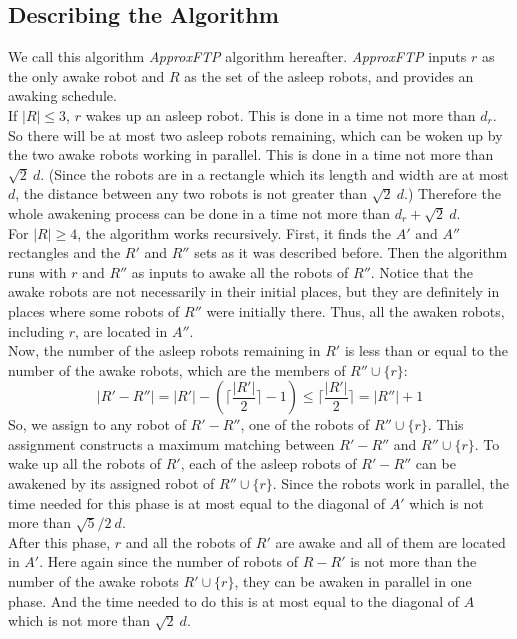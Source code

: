 \documentclass{cccg12}
\begin{document}
\subsection{Describing the Algorithm}
We call this algorithm \textit{ApproxFTP} algorithm hereafter. \textit{ApproxFTP}  inputs $r$ as the only awake robot and $R$ as the set of the asleep robots, and provides an awaking schedule.\\
If ${|R| \leq 3 }$, $r$ wakes up an asleep robot. This is done in a time not more than $d_r$.  So there will be at most two asleep robots remaining, which can be woken up by the two awake robots working in parallel. This is done in a time not more than ${ \sqrt{2}~d }$. (Since the robots are in a rectangle which its length and width are at most $d$, the distance between any two robots is not greater than ${ \sqrt{2}~d }$.) Therefore the whole awakening process can be done in a time not more than ${ d_r+\sqrt{2}~d }$.\\
For ${|R| \geq 4 }$, the algorithm works recursively. First, it finds the $A'$ and $A''$ rectangles and the $R'$ and $R''$ sets as it was described before. Then the algorithm runs with $r$ and $R''$ as inputs to awake all the robots of $R''$. Notice that the awake robots are not necessarily in their initial places, but they are definitely in places where some robots of $R''$ were initially there. Thus, all the awaken robots, including $r$, are located in $A''$.\\
Now, the number of the asleep robots remaining in $R'$ is less than or equal to the number of the awake robots, which are the members of  ${ R'' \cup \{r\} }$:
{\small$$ |R'-R''|=|R'|-(\bigg\lceil\frac{|R'|}{2}\bigg\rceil-1) \leq \bigg\lceil\frac{|R'|}{2}\bigg\rceil = |R''|+1 $$}
So, we assign to any robot of ${ R'-R'' }$, one of the robots of ${ R'' \cup \{r\} }$. This assignment constructs a maximum matching between ${ R'-R'' }$ and ${ R'' \cup \{r\} }$. To wake up all the robots of $R'$, each of the asleep robots of ${ R'-R'' }$ can be awakened by its assigned robot of ${ R'' \cup \{r\} }$. Since the robots work in parallel, the time needed for this phase is at most equal to the diagonal of $A'$ which is not more than ${ \sqrt{5}/2~d }$.\\
After this phase, $r$ and all the robots of $R'$ are awake and all of them are located in $A'$. Here again since the number of robots of ${ R-R' }$ is not more than the number of the awake robots ${ R' \cup \{r\} }$, they can be awaken in parallel in one phase. And the time needed to do this is at most equal to the diagonal of $A$ which is not more than ${\sqrt{2}~d }$.
\end{document}
